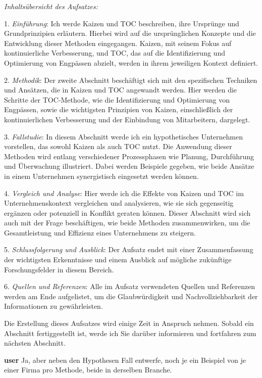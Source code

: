 \textit{Inhaltsübersicht des Aufsatzes:}

1. \textit{Einführung}: Ich werde Kaizen und TOC beschreiben, ihre Ursprünge und Grundprinzipien erläutern. Hierbei wird auf die ursprünglichen Konzepte und die Entwicklung dieser Methoden eingegangen. Kaizen, mit seinem Fokus auf kontinuierliche Verbesserung, und TOC, das auf die Identifizierung und Optimierung von Engpässen abzielt, werden in ihrem jeweiligen Kontext definiert.

2. \textit{Methodik}: Der zweite Abschnitt beschäftigt sich mit den spezifischen Techniken und Ansätzen, die in Kaizen und TOC angewandt werden. Hier werden die Schritte der TOC-Methode, wie die Identifizierung und Optimierung von Engpässen, sowie die wichtigsten Prinzipien von Kaizen, einschließlich der kontinuierlichen Verbesserung und der Einbindung von Mitarbeitern, dargelegt.

3. \textit{Fallstudie}: In diesem Abschnitt werde ich ein hypothetisches Unternehmen vorstellen, das sowohl Kaizen als auch TOC nutzt. Die Anwendung dieser Methoden wird entlang verschiedener Prozessphasen wie Planung, Durchführung und Überwachung illustriert. Dabei werden Beispiele gegeben, wie beide Ansätze in einem Unternehmen synergistisch eingesetzt werden können.

4. \textit{Vergleich und Analyse}: Hier werde ich die Effekte von Kaizen und TOC im Unternehmenskontext vergleichen und analysieren, wie sie sich gegenseitig ergänzen oder potenziell in Konflikt geraten können. Dieser Abschnitt wird sich auch mit der Frage beschäftigen, wie beide Methoden zusammenwirken, um die Gesamtleistung und Effizienz eines Unternehmens zu steigern.

5. \textit{Schlussfolgerung und Ausblick}: Der Aufsatz endet mit einer Zusammenfassung der wichtigsten Erkenntnisse und einem Ausblick auf mögliche zukünftige Forschungsfelder in diesem Bereich.

6. \textit{Quellen und Referenzen}: Alle im Aufsatz verwendeten Quellen und Referenzen werden am Ende aufgelistet, um die Glaubwürdigkeit und Nachvollziehbarkeit der Informationen zu gewährleisten.

Die Erstellung dieses Aufsatzes wird einige Zeit in Anspruch nehmen. Sobald ein Abschnitt fertiggestellt ist, werde ich Sie darüber informieren und fortfahren zum nächsten Abschnitt.

\textbf{user}
Ja, aber neben den Hypothesen Fall entwerfe, noch je ein Beispiel von je einer Firma pro Methode, beide in derselben Branche. 

